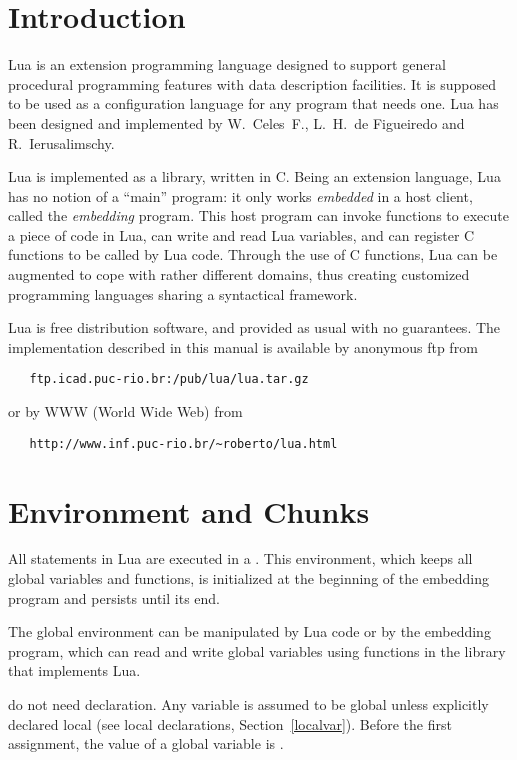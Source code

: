 \section{Introduction}

Lua is an extension programming language designed to support
general procedural programming features with data description
facilities.
It is supposed to be used as a configuration language for any
program that needs one.
Lua has been designed and implemented by
W.~Celes~F., L.~H.~de Figueiredo and R.~Ierusalimschy.

Lua is implemented as a library, written in C.
Being an extension language, Lua has no notion of a ``main'' program:
it only works {\em embedded} in a host client,
called the {\em embedding} program.
This host program can invoke functions to execute a piece of
code in Lua, can write and read Lua variables,
and can register C functions to be called by Lua code.
Through the use of C functions, Lua can be augmented to cope with
rather different domains,
thus creating customized programming languages sharing a syntactical framework.

Lua is free distribution software,
and provided as usual with no guarantees.
The implementation described in this manual is available
by anonymous ftp from
\begin{verbatim}
   ftp.icad.puc-rio.br:/pub/lua/lua.tar.gz
\end{verbatim}
or by WWW (World Wide Web) from
\begin{verbatim}
   http://www.inf.puc-rio.br/~roberto/lua.html
\end{verbatim}


\section{Environment and Chunks}

All statements in Lua are executed in a .
This environment, which keeps all global variables and functions,
is initialized at the beginning of the embedding program and
persists until its end.

The global environment can be manipulated by Lua code or
by the embedding program,
which can read and write global variables
using functions in the library that implements Lua.

 do not need declaration.
Any variable is assumed to be global unless explicitly declared local
(see local declarations, Section~\ref{localvar}).
Before the first assignment, the value of a global variable is \nil.

